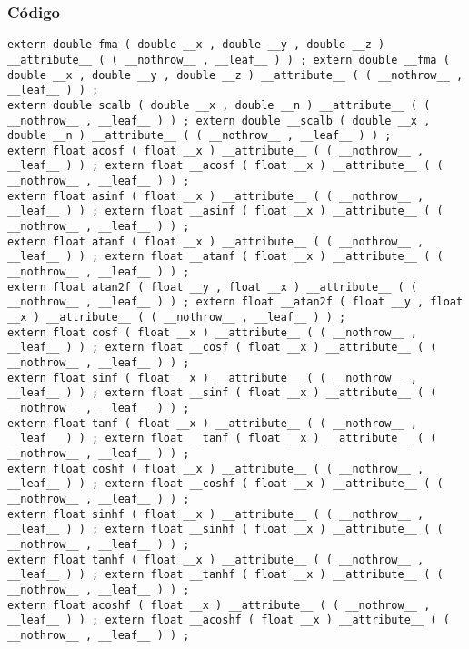 \documentclass{beamer}
\begin{document}
\begin{frame}[fragile]
\frametitle{C\'odigo}
\begin{verbatim}
extern double fma ( double __x , double __y , double __z ) __attribute__ ( ( __nothrow__ , __leaf__ ) ) ; extern double __fma ( double __x , double __y , double __z ) __attribute__ ( ( __nothrow__ , __leaf__ ) ) ; 
extern double scalb ( double __x , double __n ) __attribute__ ( ( __nothrow__ , __leaf__ ) ) ; extern double __scalb ( double __x , double __n ) __attribute__ ( ( __nothrow__ , __leaf__ ) ) ; 
extern float acosf ( float __x ) __attribute__ ( ( __nothrow__ , __leaf__ ) ) ; extern float __acosf ( float __x ) __attribute__ ( ( __nothrow__ , __leaf__ ) ) ; 
extern float asinf ( float __x ) __attribute__ ( ( __nothrow__ , __leaf__ ) ) ; extern float __asinf ( float __x ) __attribute__ ( ( __nothrow__ , __leaf__ ) ) ; 
extern float atanf ( float __x ) __attribute__ ( ( __nothrow__ , __leaf__ ) ) ; extern float __atanf ( float __x ) __attribute__ ( ( __nothrow__ , __leaf__ ) ) ; 
extern float atan2f ( float __y , float __x ) __attribute__ ( ( __nothrow__ , __leaf__ ) ) ; extern float __atan2f ( float __y , float __x ) __attribute__ ( ( __nothrow__ , __leaf__ ) ) ; 
extern float cosf ( float __x ) __attribute__ ( ( __nothrow__ , __leaf__ ) ) ; extern float __cosf ( float __x ) __attribute__ ( ( __nothrow__ , __leaf__ ) ) ; 
extern float sinf ( float __x ) __attribute__ ( ( __nothrow__ , __leaf__ ) ) ; extern float __sinf ( float __x ) __attribute__ ( ( __nothrow__ , __leaf__ ) ) ; 
extern float tanf ( float __x ) __attribute__ ( ( __nothrow__ , __leaf__ ) ) ; extern float __tanf ( float __x ) __attribute__ ( ( __nothrow__ , __leaf__ ) ) ; 
extern float coshf ( float __x ) __attribute__ ( ( __nothrow__ , __leaf__ ) ) ; extern float __coshf ( float __x ) __attribute__ ( ( __nothrow__ , __leaf__ ) ) ; 
extern float sinhf ( float __x ) __attribute__ ( ( __nothrow__ , __leaf__ ) ) ; extern float __sinhf ( float __x ) __attribute__ ( ( __nothrow__ , __leaf__ ) ) ; 
extern float tanhf ( float __x ) __attribute__ ( ( __nothrow__ , __leaf__ ) ) ; extern float __tanhf ( float __x ) __attribute__ ( ( __nothrow__ , __leaf__ ) ) ; 
extern float acoshf ( float __x ) __attribute__ ( ( __nothrow__ , __leaf__ ) ) ; extern float __acoshf ( float __x ) __attribute__ ( ( __nothrow__ , __leaf__ ) ) ; 
\end{verbatim}
\end{frame}
\end{document}
